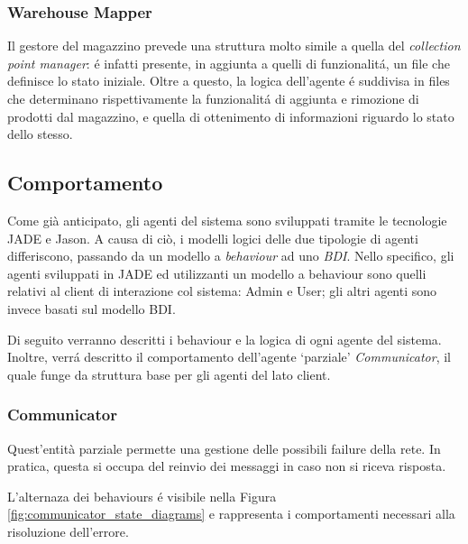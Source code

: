 \subsubsection{Warehouse Mapper}
Il gestore del magazzino prevede una struttura molto simile a quella del \textit{collection point manager}: \'e infatti presente, in aggiunta a quelli di funzionalit\'a, un file che definisce lo stato iniziale. Oltre a questo, la logica dell'agente \'e suddivisa in files che determinano rispettivamente la funzionalit\'a di aggiunta e rimozione di prodotti dal magazzino, e quella di ottenimento di informazioni riguardo lo stato dello stesso.%

\subsection{Comportamento}
% 

Come già anticipato, gli agenti del sistema sono sviluppati tramite le tecnologie JADE e Jason. A causa di ciò, i modelli logici delle due tipologie di agenti differiscono, passando da un modello a \textit{behaviour} ad uno \textit{BDI}. Nello specifico, gli agenti sviluppati in JADE ed utilizzanti un modello a behaviour sono quelli relativi al client di interazione col sistema: Admin e User; gli altri agenti sono invece basati sul modello BDI.

Di seguito verranno descritti i behaviour e la logica di ogni agente del sistema. Inoltre, verr\'a descritto il comportamento dell'agente `parziale' \textit{Communicator}, il quale funge da struttura base per gli agenti del lato client.

\subsubsection{Communicator}
Quest'entità parziale permette una gestione delle possibili failure della rete. In pratica, questa si occupa del reinvio dei messaggi in caso non si riceva risposta.

L'alternaza dei behaviours \'e visibile nella Figura \ref{fig:communicator_state_diagrams} e rappresenta i comportamenti necessari alla risoluzione dell'errore.

